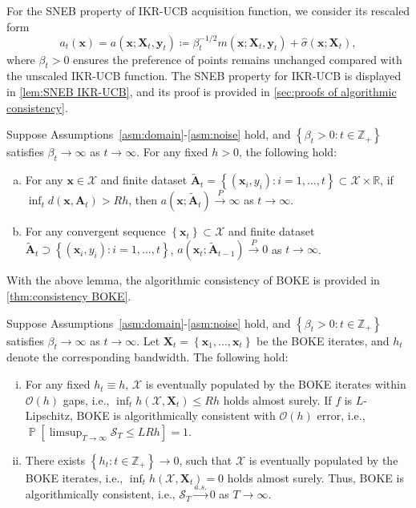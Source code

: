 \documentclass[11pt,en]{elegantpaper}
\newcommand{\domain}{\mathcal{X}}
\newcommand{\X}{\bm{X}}
\newcommand{\x}{\bm{x}}
\newcommand{\y}{\bm{y}}
\newcommand{\A}{\bm{A}}
\newcommand{\order}{\mathcal{O}}
\newcommand{\simregret}{\mathcal{S}}
\newcommand{\1}{\mathds{1}}
\newcommand{\pto}{\overset{P}{\longrightarrow}}
\newcommand{\asto}{\overset{a.s.}{\longrightarrow}}
\newcommand{\set}[1]{\left\{#1\right\}}
\DeclareMathOperator*{\Prob}{\mathbb{P}}
\begin{document}
For the SNEB property of IKR-UCB acquisition function, we consider its rescaled form
\begin{equation}
    a_t(\x) = a(\x; \X_t, \y_t) \coloneqq \beta_t^{-1/2} m(\x; \X_t, \y_t) + \widehat{\sigma}(\x; \X_t),
\end{equation}
where $\beta_t > 0$ ensures the preference of points remains unchanged compared with the unscaled IKR-UCB function. The SNEB property for IKR-UCB is displayed in \cref{lem:SNEB IKR-UCB}, and its proof is provided in \cref{sec:proofs of algorithmic consistency}.


\begin{lemma}
    \label{lem:SNEB IKR-UCB}
    Suppose Assumptions~\ref{asm:domain}-\ref{asm:noise} hold, and $\set{\beta_t > 0 : t \in \mathbb{Z}_+}$ satisfies $\beta_t \to \infty$ as $t \to \infty$. For any fixed $h > 0$, the following hold:
    \begin{enumerate}[(a)]
        \item\label{it1:SNEB IKR-UCB} For any $\x \in \domain$ and finite dataset $\tilde{\A}_t = \set{(\x_i, y_i) : i = 1, \dots, t} \subset \domain \times \mathbb{R}$, if $\inf_{t} d(\x, \A_t) > R h$, then $a(\x; \tilde{\A}_t) \pto \infty$ as $t \to \infty$.
        
        \item\label{it2:SNEB IKR-UCB} For any convergent sequence $\set{\x_t} \subset \domain$ and finite dataset $\tilde{\A}_t \supset \set{(\x_i, y_i) : i = 1, \dots, t}$, $a(\x_t; \tilde{\A}_{t-1}) \pto 0$ as $t \to \infty$.
    \end{enumerate}
\end{lemma}


With the above lemma, the algorithmic consistency of BOKE is provided in \cref{thm:consistency BOKE}.


\begin{theorem}
    \label{thm:consistency BOKE}
    Suppose Assumptions~\ref{asm:domain}-\ref{asm:noise} hold, and $\set{\beta_t > 0 : t \in \mathbb{Z}_+}$ satisfies $\beta_t \to \infty$ as $t \to \infty$. Let $\X_t = \set{\x_1, \dots, \x_t}$ be the BOKE iterates, and $h_t$ denote the corresponding bandwidth. The following hold:
    \begin{enumerate}[(i)]
        \item\label{it1:consistency BOKE} For any fixed $h_t \equiv h$, $\domain$ is eventually populated by the BOKE iterates within $\order(h)$ gaps, i.e., $\inf_t h(\domain, \X_t) \le R h$ holds almost surely. If $f$ is $L$-Lipschitz, BOKE is algorithmically consistent with $\order(h)$ error, i.e., $\Prob\left[ \limsup_{T \to \infty} \simregret_T \le L R h \right] = 1$.

        \item\label{it2:consistency BOKE} There exists $\set{h_t : t \in \mathbb{Z}_+} \to 0$, such that $\domain$ is eventually populated by the BOKE iterates, i.e., $\inf_t h(\domain, \X_t) = 0$ holds almost surely. Thus, BOKE is algorithmically consistent, i.e., $\simregret_T \asto 0$ as $T \to \infty$.
    \end{enumerate}
\end{theorem}
\end{document}
